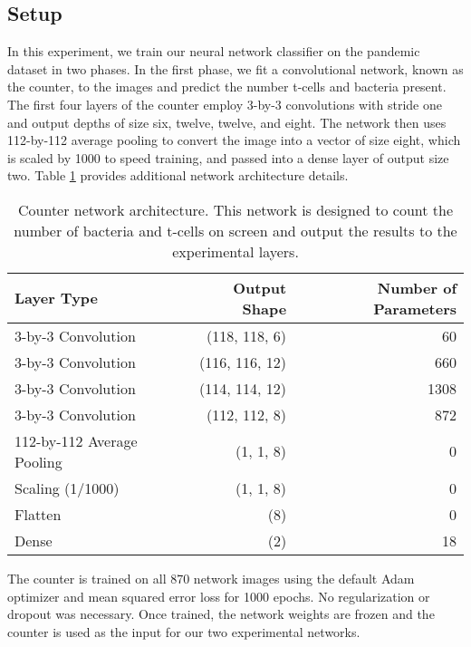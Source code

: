 \subsection{Setup}

In this experiment, we train our neural network classifier on the pandemic dataset in two phases. In the first phase, we fit a convolutional network, known as the counter, to the images and predict the number t-cells and bacteria present. The first four layers of the counter employ 3-by-3 convolutions with stride one and output depths of size six, twelve, twelve, and eight. The network then uses 112-by-112 average pooling to convert the image into a vector of size eight, which is scaled by 1000 to speed training, and passed into a dense layer of output size two. Table \ref{table:counter_network} provides additional network architecture details.

\begin{table}[h]
    \centering
    \begin{tabular}{lrr}
        \toprule
        Layer Type & Output Shape & Number of Parameters \\
        \midrule
            3-by-3 Convolution & (118, 118, 6)  & 60   \\
            3-by-3 Convolution & (116, 116, 12) & 660  \\
            3-by-3 Convolution & (114, 114, 12) & 1308 \\
            3-by-3 Convolution & (112, 112, 8)  & 872  \\
            112-by-112 Average Pooling & (1, 1, 8) & 0 \\
            Scaling (1/1000) & (1, 1, 8) & 0        \\
            Flatten & (8) & 0 \\
            Dense & (2) & 18 \\
        \bottomrule
    \end{tabular}
\caption{Counter network architecture. This network is designed to count the number of bacteria and t-cells on screen and output the results to the experimental layers.}
\label{table:counter_network}
\end{table}

The counter is trained on all 870 network images using the default Adam optimizer and mean squared error loss for 1000 epochs. No regularization or dropout was necessary. Once trained, the network weights are frozen and the counter is used as the input for our two experimental networks.

